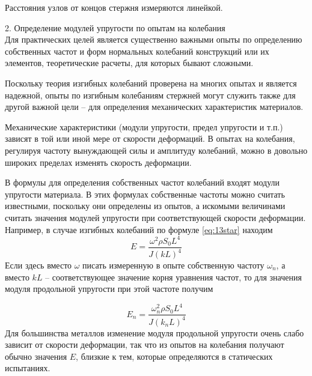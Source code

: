 \documentclass[specialist, subf, href, colorlinks=true, 14pt, final]{disser}
\theoremstyle{definition}
\begin{document}
Расстояния узлов от концов стержня измеряются линейкой.
\begin{figure}[!htp]
  \caption{}
  \label{1-3-3}
\end{figure}

2. Определение модулей упругости по опытам на колебания\\
Для практических целей является существенно важными опыты по определению собственных частот и форм нормальных колебаний конструкций или их элементов, теоретические расчеты, для которых бывают сложными.

Поскольку теория изгибных колебаний проверена на многих опытах и является надежной, опыты по изгибным колебаниям стержней могут служить также для другой важной цели -- для определения механических характеристик материалов.

Механические характеристики (модули упругости, предел упругости и т.п.) зависят в той или иной мере от скорости деформаций. В опытах на колебания, регулируя частоту вынуждающей силы и амплитуду колебаний, можно в довольно широких пределах изменять скорость деформации.

В формулы для определения собственных частот колебаний 
входят модули упругости материала. В этих формулах собственные 
частоты можно считать известными, поскольку они определены из 
опытов, а искомыми величинами считать значения модулей упругости
при соответствующей скорости деформации. Например, в случае изгибных колебаний по формуле \eqref{eq:13star} находим
\[
  E = \frac{\omega^{2}\rho S_{0}L^{4}}{J(kL)^4}
\]
Если здесь вместо $\omega$ писать измеренную в опыте собственную
частоту $\omega_{n}$, а вместо $kL$ -- соответствующее значение корня уравнения частот, то для значения модуля продольной упругости при этой частоте получим
\addtocounter{equation}{1}
\begin{equation}\label{eq:1316}
  E_{n} = \frac{\omega_{n}^{2}\rho S_{0}L^{4}}{J(k_{n}L)^4}
  \tag{16}
\end{equation}
Для большинства металлов изменение модуля продольной упругости
очень слабо зависит от скорости деформации, так что из опытов
на колебания получают обычно значения $E$, близкие к тем, которые определяются в статических испытаниях.
\end{document}
